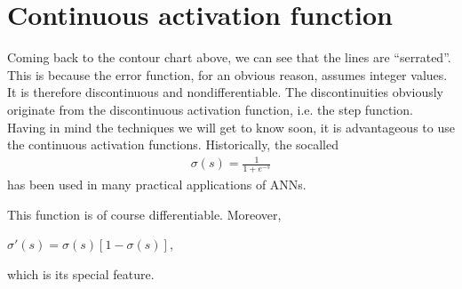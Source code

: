 \documentclass[letterpaper,10pt,english]{jupyterBook}
\begin{document}
\section{Continuous activation function}
\label{\detokenize{docs/backprop:continuous-activation-function}}
\sphinxAtStartPar
Coming back to the contour chart above, we can see that the lines are “serrated”. This is because the error function, for an obvious reason, assumes integer values. It is therefore discontinuous and non\sphinxhyphen{}differentiable. The discontinuities obviously originate from the discontinuous activation function, i.e. the step function. Having in mind the techniques we will get to know soon, it is advantageous to use the continuous activation functions. Historically, the so\sphinxhyphen{}called 
\begin{equation*}
\begin{split} \sigma(s)=\frac{1}{1+e^{-s}}\end{split}
\end{equation*}
\sphinxAtStartPar
has been used in many practical applications of ANNs.

\begin{sphinxVerbatim}[commandchars=\\\{\}]
 
     
\end{sphinxVerbatim}

\begin{sphinxVerbatim}[commandchars=\\\{\}]
\end{sphinxVerbatim}

\noindent{}

\sphinxAtStartPar
This function is of course differentiable. Moreover,

\sphinxAtStartPar
\( \sigma '(s) = \sigma (s) [1- \sigma (s)] \),

\sphinxAtStartPar
which is its special feature.
\end{document}
